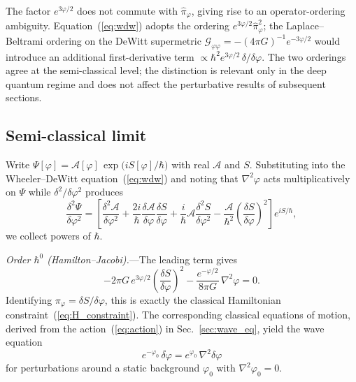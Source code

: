 \documentclass[aps,prd,onecolumn,superscriptaddress,nofootinbib,showpacs,12pt,notitlepage]{revtex4-2}
\begin{document}
The factor $e^{3\varphi/2}$ does not commute with
$\hat{\pi}_\varphi$, giving rise to an operator-ordering
ambiguity.  Equation~(\ref{eq:wdw}) adopts the ordering
$e^{3\varphi/2}\hat{\pi}_\varphi^2$; the Laplace--Beltrami
ordering on the DeWitt supermetric
$\mathcal{G}_{\varphi\varphi} =
  -(4\pi G)^{-1}e^{-3\varphi/2}$
would introduce an additional first-derivative term
$\propto\hbar^2 e^{3\varphi/2}\,
  \delta/\delta\varphi$.
The two orderings agree at the semi-classical level; the
distinction is relevant only in the deep quantum regime
and does not affect the perturbative results of subsequent
sections.

\subsection{Semi-classical limit}
\label{sec:semiclassical}

Write $\Psi[\varphi] = \mathcal{A}[\varphi]\,
\exp\!\bigl(iS[\varphi]/\hbar\bigr)$ with real
$\mathcal{A}$ and $S$.  Substituting into the
Wheeler--DeWitt equation~(\ref{eq:wdw}) and noting
that $\nabla^2\varphi$ acts multiplicatively on $\Psi$
while $\delta^2/\delta\varphi^2$ produces
\begin{equation}
  \frac{\delta^2\Psi}{\delta\varphi^2}
  = \left[\frac{\delta^2\mathcal{A}}{\delta\varphi^2}
    + \frac{2i}{\hbar}\frac{\delta\mathcal{A}}{\delta\varphi}
      \frac{\delta S}{\delta\varphi}
    + \frac{i}{\hbar}\mathcal{A}
      \frac{\delta^2 S}{\delta\varphi^2}
    - \frac{\mathcal{A}}{\hbar^2}
      \!\left(\frac{\delta S}{\delta\varphi}\right)^{\!2}
  \right]e^{iS/\hbar},
\end{equation}
we collect powers of $\hbar$.

\textit{Order $\hbar^0$ (Hamilton--Jacobi).}---The leading
term gives
\begin{equation}\label{eq:HJ}
  -2\pi G\,e^{3\varphi/2}
    \!\left(\frac{\delta S}{\delta\varphi}\right)^{\!2}
  - \frac{e^{-\varphi/2}}{8\pi G}\,\nabla^2\varphi
  = 0.
\end{equation}
Identifying $\pi_\varphi = \delta S/\delta\varphi$, this
is exactly the classical Hamiltonian
constraint~(\ref{eq:H_constraint}).  The corresponding
classical equations of motion, derived from the
action~(\ref{eq:action}) in Sec.~\ref{sec:wave_eq},
yield the wave equation
\begin{equation}
  e^{-\varphi_0}\,\ddot{\delta\varphi}
  = e^{\varphi_0}\,\nabla^2\delta\varphi
\end{equation}
for perturbations around a static background
$\varphi_0$ with $\nabla^2\varphi_0 = 0$.
\end{document}
